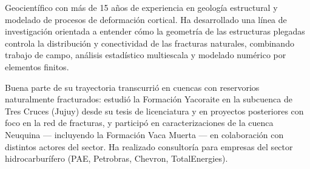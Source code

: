 
\begin{cvparagraph}

Geocientífico con más de 15 años de experiencia en geología estructural y modelado de procesos de deformación cortical. Ha desarrollado una línea de investigación orientada a entender cómo la geometría de las estructuras plegadas controla la distribución y conectividad de las fracturas naturales, combinando trabajo de campo, análisis estadístico multiescala y modelado numérico por elementos finitos. 
  
Buena parte de su trayectoria transcurrió en cuencas con reservorios naturalmente fracturados: estudió la Formación Yacoraite en la subcuenca de Tres Cruces (Jujuy) desde su tesis de licenciatura y en proyectos posteriores con foco en la red de fracturas, y
  participó en caracterizaciones de la cuenca Neuquina — incluyendo la Formación Vaca Muerta — en colaboración con distintos actores del sector. Ha realizado consultoría para empresas del sector hidrocarburífero (PAE, Petrobras, Chevron, TotalEnergies).


\end{cvparagraph}
